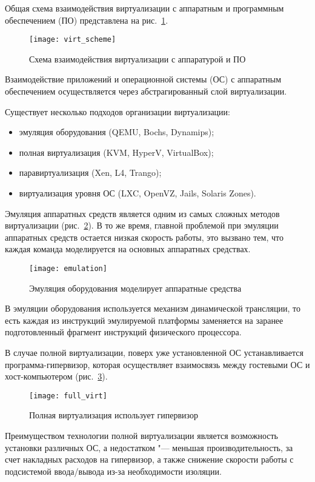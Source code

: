 Общая схема взаимодействия виртуализации с аппаратным и программным обеспечением (ПО) представлена на рис.~\ref{pic:virt_scheme}.
\begin{figure}[ht]
    \centering
	\texttt{[image: virt\_scheme]}
	\caption{Схема взаимодействия виртуализации с аппаратурой и ПО}\label{pic:virt_scheme}
\end{figure}

Взаимодействие приложений и операционной системы (ОС) с аппаратным обеспечением осуществляется через абстрагированный слой виртуализации.

Существует несколько подходов организации виртуализации:
\begin{itemize}
    \item эмуляция оборудования (QEMU, Bochs, Dynamips);
    \item полная виртуализация (KVM, HyperV, VirtualBox);
    \item паравиртуализация (Xen, L4, Trango);
    \item виртуализация уровня ОС (LXC, OpenVZ, Jails, Solaris Zones).
\end{itemize}

Эмуляция аппаратных средств является одним из самых сложных методов виртуализации (рис.~\ref{pic:emulation}).
В то же время, главной проблемой при эмуляции аппаратных средств остается низкая скорость работы, это вызвано тем, что каждая команда моделируется на основных аппаратных средствах.
\begin{figure}[ht]
    \centering
	\texttt{[image: emulation]}
	\caption{Эмуляция оборудования моделирует аппаратные средства}\label{pic:emulation}
\end{figure}

В эмуляции оборудования используется механизм динамической трансляции, то есть каждая из инструкций эмулируемой платформы заменяется на заранее подготовленный фрагмент инструкций физического процессора.

В случае полной виртуализации, поверх уже установленной ОС устанавливается программа-гипервизор, которая осуществляет взаимосвязь между гостевыми ОС и хост-компьютером (рис.~\ref{pic:full_virt}).
\begin{figure}[ht]
    \centering
	\texttt{[image: full\_virt]}
	\caption{Полная виртуализация использует гипервизор}\label{pic:full_virt}
\end{figure}

Преимуществом технологии полной виртуализации является возможность установки различных ОС, а недостатком "--- меньшая производительность, за счет накладных расходов на гипервизор, а также снижение скорости работы с подсистемой ввода/вывода из-за необходимости изоляции.

